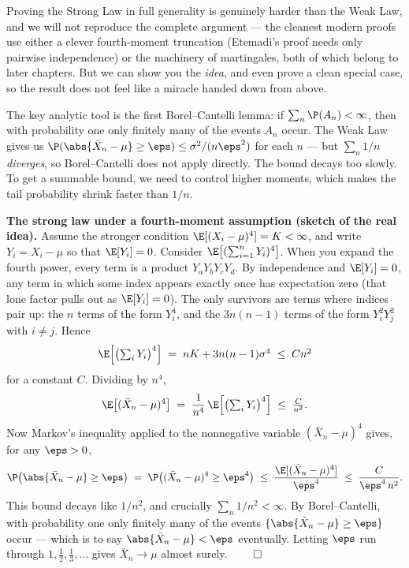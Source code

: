 Proving the Strong Law in full generality is genuinely harder than the Weak Law, and we will not reproduce the complete argument --- the cleanest modern proofs use either a clever fourth-moment truncation (Etemadi's proof needs only pairwise independence) or the machinery of martingales, both of which belong to later chapters. But we can show you the \emph{idea}, and even prove a clean special case, so the result does not feel like a miracle handed down from above.

The key analytic tool is the first Borel--Cantelli lemma: if $\sum_n \P(A_n) < \infty$, then with probability one only finitely many of the events $A_n$ occur. The Weak Law gives us $\P(\abs{\bar X_n - \mu} \ge \eps) \le \sigma^2/(n\eps^2)$ for each $n$ --- but $\sum_n 1/n$ \emph{diverges}, so Borel--Cantelli does not apply directly. The bound decays too slowly. To get a summable bound, we need to control higher moments, which makes the tail probability shrink faster than $1/n$.

\begin{whybox}
\textbf{The strong law under a fourth-moment assumption (sketch of the real idea).} Assume the stronger condition $\E[(X_i-\mu)^4] = K < \infty$, and write $Y_i = X_i - \mu$ so that $\E[Y_i]=0$. Consider $\E\bigl[(\sum_{i=1}^n Y_i)^4\bigr]$. When you expand the fourth power, every term is a product $Y_a Y_b Y_c Y_d$. By independence and $\E[Y_i]=0$, any term in which some index appears exactly once has expectation zero (that lone factor pulls out as $\E[Y_i]=0$). The only survivors are terms where indices pair up: the $n$ terms of the form $Y_i^4$, and the $3n(n-1)$ terms of the form $Y_i^2 Y_j^2$ with $i\ne j$. Hence
\[
  \E\Bigl[\bigl(\textstyle\sum_i Y_i\bigr)^4\Bigr] \;=\; nK + 3n(n-1)\sigma^4 \;\le\; Cn^2
\]
for a constant $C$. Dividing by $n^4$,
\[
  \E\bigl[(\bar X_n - \mu)^4\bigr] \;=\; \frac{1}{n^4}\,\E\Bigl[\bigl(\textstyle\sum_i Y_i\bigr)^4\Bigr] \;\le\; \frac{C}{n^2}.
\]
Now Markov's inequality applied to the nonnegative variable $(\bar X_n-\mu)^4$ gives, for any $\eps>0$,
\[
  \P\bigl(\abs{\bar X_n - \mu} \ge \eps\bigr) \;=\; \P\bigl((\bar X_n-\mu)^4 \ge \eps^4\bigr) \;\le\; \frac{\E[(\bar X_n-\mu)^4]}{\eps^4} \;\le\; \frac{C}{\eps^4\,n^2}.
\]
This bound decays like $1/n^2$, and crucially $\sum_n 1/n^2 < \infty$. By Borel--Cantelli, with probability one only finitely many of the events $\{\abs{\bar X_n - \mu}\ge\eps\}$ occur --- which is to say $\abs{\bar X_n - \mu} < \eps$ eventually. Letting $\eps$ run through $1, \tfrac12, \tfrac13, \dots$ gives $\bar X_n \to \mu$ almost surely. $\qed$
\end{whybox}

